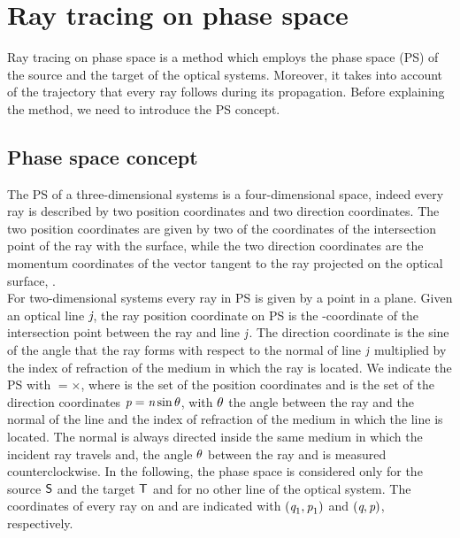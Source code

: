 \chapter{Ray tracing on phase space} \label{chap:PS}
Ray tracing on phase space is a method which employs the phase space (PS) of the source and the target of the optical systems. 
Moreover, it takes into account of the trajectory that every ray follows during its propagation.
Before explaining the method, we need to introduce the PS concept.
\section{Phase space concept}
The PS of a three-dimensional systems is a four-dimensional space, indeed every ray is described by two position coordinates
and two direction coordinates.
The two position coordinates are given by two of the coordinates of the intersection point of the ray with the surface, while the two direction coordinates are
the momentum coordinates of the vector tangent to the ray projected on the optical surface, \cite{wolf2004geometric}.
\\ \indent For two-dimensional systems every ray in PS is given by a point in a plane.
Given an optical line $\textit{j}$, the ray position coordinate on PS is the -coordinate of the intersection point between the ray and line $\textit{j}$.
The direction coordinate is the sine of the angle that the ray forms with respect to the normal of line $\textit{j}$ multiplied by the index of refraction of the medium in which the ray is located.
We indicate the PS with $=$$\times$,
where  is the set of the position coordinates  and  is the set of the direction coordinates $\textit{p}=\textit{n}\sin{\theta}$, with $\theta$ the angle between the ray and the normal \vect{$\boldsymbol{\nu}$} of the line and  the index of refraction of the medium in which the line is located.  
The normal \vect{$\boldsymbol{\nu}$} is always directed inside the same medium in which the incident ray travels and, 
the angle $\theta$ between the ray and \vect{$\boldsymbol{\nu}$} is measured counterclockwise.
In the following, the phase space is considered only for the source $\textsf{S}$ and the target $\textsf{T}$ and for no other line of the optical system.
The coordinates of every ray on  and  are indicated with $(\textit{q}_1,\textit{p}_1)$ and $(\textit{q},\textit{p})$, respectively.\\ \indent 
